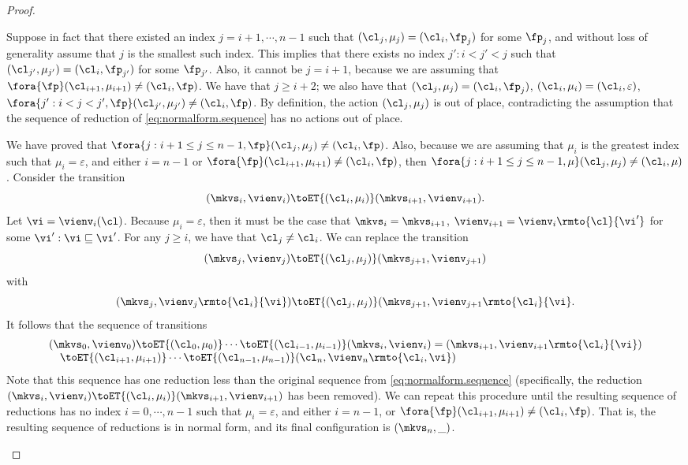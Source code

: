 \begin{proof}
\begin{enumerate}
Suppose in fact that there existed 
an index $j = i+1,\cdots, n-1$ such that $(\cl_{j}, \mu_{j}) = (\cl_{i}, \fp_{j})$ for some 
$\fp_{j}$, and without loss of generality assume that $j$ is the smallest such index. This implies that 
there exists no index $j': i < j' < j$ such that $(\cl_{j'}, \mu_{j'}) = (\cl_{i}, \fp_{j'})$ for some 
$\fp_{j'}$. Also, it cannot be $j = i+1$, because we are assuming that $\fora{ \fp } (\cl_{i+1}, \mu_{i+1}) \neq 
(\cl_{i}, \fp)$.  We have that $j \geq i+2$; we also have that  $(\cl_{j}, \mu_{j}) = (\cl_{i}, \fp_{j})$, 
$(\cl_{i}, \mu_{i}) = (\cl_{i}, \varepsilon)$, $\fora{ j': i < j < j', \fp } (\cl_{j'}, \mu_{j'}) \neq (\cl_{i}, \fp)$. 
By definition, the action $(\cl_{j}, \mu_{j})$ is out of place, contradicting the assumption that the sequence of 
reduction of \cref{eq:normalform.sequence} has no actions out of place.

We have proved that $\fora{ j : i+1 \leq j \leq n-1, \fp } (\cl_{j}, \mu_{j}) \neq (\cl_{i}, \fp)$. 
Also, because we are assuming that $\mu_{i}$ is the greatest index such that $\mu_{i} = \varepsilon$, 
and either $i= n-1$ or $\fora{ \fp } (\cl_{i+1},\mu_{i+1}) \neq (\cl_{i}, \fp)$, 
then $\fora{ j : i+1 \leq j \leq n-1, \mu } (\cl_{j}, \mu_{j}) \neq (\cl_{i}, \mu)$. 
Consider the transition 
\[
(\mkvs_{i}, \vienv_{i}) \toET{(\cl_{i}, \mu_{i})} (\mkvs_{i+1}, \vienv_{i+1}).
\]
Let $\vi = \vienv_{i}(\cl)$. Because $\mu_{i} = \varepsilon$, then it must be the case that 
$\mkvs_{i} = \mkvs_{i+1}$, $\vienv_{i+1} = \vienv_{i}\rmto{\cl}{\vi'}$ for some $\vi' : \vi \sqsubseteq \vi'$. 
For any $j \geq i$, we have that $\cl_{j} \neq \cl_{i}$. We can replace the transition 
\[
(\mkvs_{j}, \vienv_{j}) \toET{(\cl_{j}, \mu_{j})} (\mkvs_{j+1}, \vienv_{j+1})
\]
with 
\[
(\mkvs_{j}, \vienv_{j}\rmto{\cl_{i}}{\vi}) \toET{(\cl_{j}, \mu_{j})} (\mkvs_{j+1}, \vienv_{j+1}\rmto{\cl_{i}}{\vi}.
\]
It follows that the sequence of transitions 
\[ 
\begin{array}{@{}l@{}}
(\mkvs_{0}, \vienv_{0}) \toET{(\cl_{0}, \mu_{0})} \cdots \toET{(\cl_{i-1},\mu_{i-1})} 
(\mkvs_{i}, \vienv_{i}) = (\mkvs_{i+1}, \vienv_{i+1}\rmto{\cl_{i}}{\vi})  \\
\quad \toET{(\cl_{i+1}, \mu_{i+1})} \cdots 
\toET{(\cl_{n-1}, \mu_{n-1})} (\cl_{n}, \vienv_{n}\rmto{\cl_{i}, \vi})
\end{array}
\]
Note that this sequence has one reduction less than the original sequence from \eqref{eq:normalform.sequence} (specifically, 
the reduction $(\mkvs_{i}, \vienv_{i}) \toET{(\cl_{i}, \mu_{i})} (\mkvs_{i+1}, \vienv_{i+1})$ has 
been removed). We can repeat this procedure until the resulting sequence of reductions has no index $i=0,\cdots, n-1$ such that  
$\mu_{i} = \varepsilon$, and either $i = n-1$, or 
$\fora{ \fp } (\cl_{i+1}, \mu_{i+1}) \neq (\cl_{i}, \fp)$. That is, the resulting sequence of reductions is in normal form, 
and its final configuration is $(\mkvs_{n}, \_)$.


\end{enumerate}
\end{proof}
